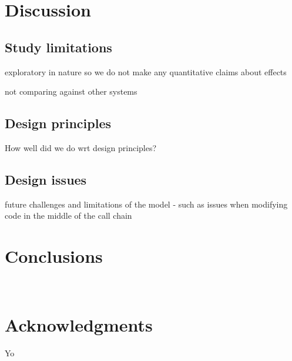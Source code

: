 \documentclass{sigchi}
\begin{document}

\section{Discussion}

\subsection{Study limitations}
exploratory in nature so we do not make any quantitative claims about effects

not comparing against other systems

\subsection{Design principles}
How well did we do wrt design principles?

\subsection{Design issues}
future challenges and limitations of the model - such as issues when modifying code
in the middle of the call chain

\section{Conclusions}

\newpage
~
\newpage

\section{Acknowledgments}
Yo

\balance{}



\end{document}
